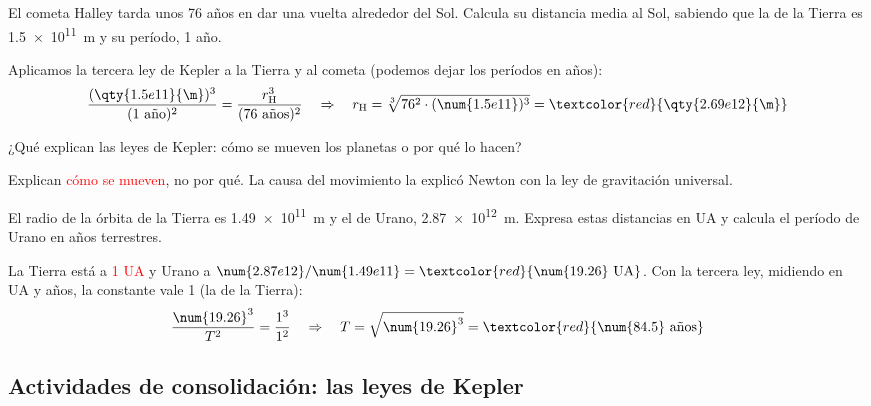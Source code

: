 \begin{example}
    El cometa Halley tarda unos 76 años en dar una vuelta alrededor del Sol. Calcula su distancia media al Sol, sabiendo que la de la Tierra es \qty{1.5e11}{\m} y su período, 1 año.

    Aplicamos la tercera ley de Kepler a la Tierra y al cometa (podemos dejar los períodos en años):
    \[ \frac{(\qty{1.5e11}{\m})^3}{(1~\text{año})^2} = \frac{r^3_{\text{H}}}{(76~\text{años})^2} \quad\Rightarrow\quad r_{\text{H}} = \sqrt[3]{76^2 \cdot (\num{1.5e11})^3} = \textcolor{red}{\qty{2.69e12}{\m}} \]
\end{example}

\begin{exercise}
    ¿Qué explican las leyes de Kepler: cómo se mueven los planetas o por qué lo hacen?
    \begin{solu}
        Explican \textcolor{red}{cómo se mueven}, no por qué. La causa del movimiento la explicó Newton con la ley de gravitación universal.
    \end{solu}
\end{exercise}

\begin{exercise}
    El radio de la órbita de la Tierra es \qty{1.49e11}{\m} y el de Urano, \qty{2.87e12}{\m}. Expresa estas distancias en UA y calcula el período de Urano en años terrestres.
    \begin{solu}
        La Tierra está a \textcolor{red}{1 UA} y Urano a \(\num{2.87e12}/\num{1.49e11} = \textcolor{red}{\num{19.26}~\text{UA}}\). Con la tercera ley, midiendo en UA y años, la constante vale 1 (la de la Tierra):
        \[ \frac{\num{19.26}^3}{T^2} = \frac{1^3}{1^2} \quad\Rightarrow\quad T = \sqrt{\num{19.26}^3} = \textcolor{red}{\num{84.5}~\text{años}} \]
    \end{solu}
\end{exercise}

\subsection*{Actividades de consolidación: las leyes de Kepler}

